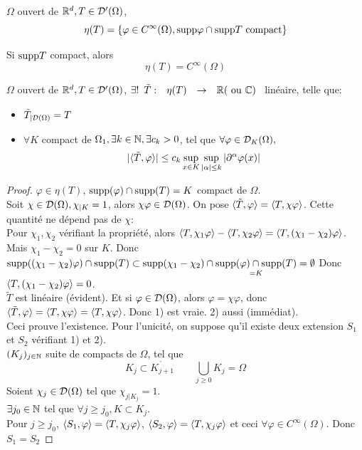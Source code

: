 \documentclass[]{report}
\begin{document}
    \begin{df}{}{}
        $\Omega$ ouvert de $\mathbb{R}^d,T\in \mathcal{D}'(\Omega)$,
        \[\eta(T)=\{\varphi\in C^{\infty}(\Omega),\text{supp} \varphi\cap \text{supp} T\text{ compact}\}\]
    \end{df}

    \begin{re}{}{}
        Si $\text{supp} T$ compact, alors
        \[\eta(T)=C^\infty(\Omega)\]
    \end{re}

    \begin{prop}{}{}
        $\Omega$ ouvert de $\mathbb{R}^d, T\in \mathcal{D}'(\Omega)$, $\exists! \begin{array}{ccccc} \tilde{T} : & \eta(T) & \to & \mathbb{R}(\text{ ou $\mathbb{C}$}) \end{array}$ linéaire, telle que:
        \begin{itemize}
            \item $\tilde{T}_{|\mathcal{D}(\Omega)}=T$
            \item $\forall K$ compact de $\Omega_1,\exists k\in \mathbb{N},\exists c_k>0$, tel que $\forall \varphi\in \mathcal{D}_{K}(\Omega),$
            \[|\langle \tilde{T},\varphi \rangle|\le c_k\sup_{x\in K}\sup_{|\alpha|\le k}|\partial^{\alpha} \varphi(x)|\]
        \end{itemize}
    \end{prop}

    \begin{proof}
        $\varphi\in \eta(T)$, $\text{supp}(\varphi)\cap \text{supp} (T)=K$ compact de $\Omega$.\\
        Soit $\chi \in \mathcal{D}(\Omega),\chi_{|K}=1$, alors $\chi \varphi\in \mathcal{D}(\Omega)$. On pose $\langle \tilde{T},\varphi \rangle=\langle T,\chi\varphi \rangle$. Cette quantité ne dépend pas de $\chi$:\\
        Pour $\chi_1,\chi_2$ vérifiant la propriété, alors $\langle T,\chi_1 \varphi \rangle-\langle T,\chi_2 \varphi \rangle=\langle T,(\chi_1-\chi_2)\varphi \rangle$.\\
        Mais $\chi_1-\chi_2=0$ sur $K$. Donc $\text{supp}((\chi_1-\chi_2)\varphi)\cap\text{supp}(T)\subset \text{supp}(\chi_1-\chi_2)\cap \underset{=K}{\text{supp}(\varphi)\cap\text{supp}(T)}=\emptyset$ Donc $\langle T,(\chi_1-\chi_2)\varphi \rangle=0$.\\
        $\tilde{T}$ est linéaire (évident). Et si $\varphi\in \mathcal{D}(\Omega)$, alors $\varphi=\chi \varphi$, donc $\langle \tilde{T},\varphi \rangle=\langle T,\chi\varphi \rangle=\langle T,\chi\varphi \rangle$. Donc 1) est vraie. 2) aussi (immédiat).\\
        Ceci prouve l'existence. Pour l'unicité, on suppose qu'il existe deux extension $S_1$ et $S_2$ vérifiant 1) et 2).\\
        $(K_j)_{j\in \mathbb{N}}$ suite de compacts de $\Omega$, tel que
        \[K_j\subset \mathring{K_{j+1}}\qquad \bigcup_{j\ge 0}K_j=\Omega\]
        Soient $\chi_j\in \mathcal{D}(\Omega)$ tel que $\chi_{j|K_j}=1$.\\
        $\exists j_0\in \mathbb{N}$ tel que $\forall j\ge j_0,K\subset K_j$.\\
        Pour $j\ge j_0$, $\langle S_1,\varphi \rangle=\langle T,\chi_j\varphi \rangle$, $\langle S_2,\varphi \rangle=\langle T,\chi_j \varphi \rangle$ et ceci $\forall \varphi\in C^{\infty}(\Omega)$. Donc $S_1=S_2$
    \end{proof}
\end{document}
